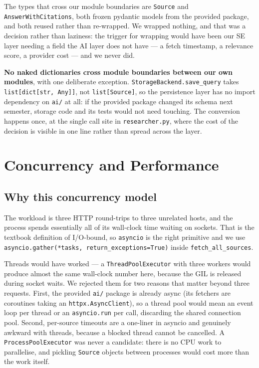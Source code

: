 \documentclass[11pt,a4paper]{article}
\begin{document}
The types that cross our module boundaries are \texttt{Source} and \texttt{AnswerWithCitations},
both frozen pydantic models from the provided package, and both reused rather than re-wrapped.
We wrapped nothing, and that was a decision rather than laziness: the trigger for wrapping would
have been our SE layer needing a field the AI layer does not have --- a fetch timestamp, a
relevance score, a provider cost --- and we never did.

\textbf{No naked dictionaries cross module boundaries between our own modules}, with one
deliberate exception. \texttt{StorageBackend.save\_query} takes \texttt{list[dict[str, Any]]},
not \texttt{list[Source]}, so the persistence layer has no import dependency on \texttt{ai/} at
all: if the provided package changed its schema next semester, storage code and its tests would
not need touching. The conversion happens once, at the single call site in
\texttt{researcher.py}, where the cost of the decision is visible in one line rather than spread
across the layer.

\section{Concurrency and Performance}\label{sec:concurrency}

\subsection{Why this concurrency model}

The workload is three HTTP round-trips to three unrelated hosts, and the process spends
essentially all of its wall-clock time waiting on sockets. That is the textbook definition of
I/O-bound, so \texttt{asyncio} is the right primitive and we use
\texttt{asyncio.gather(*tasks, return\_exceptions=True)} inside \texttt{fetch\_all\_sources}.

Threads would have worked --- a \texttt{ThreadPoolExecutor} with three workers would produce
almost the same wall-clock number here, because the GIL is released during socket waits. We
rejected them for two reasons that matter beyond three requests. First, the provided \texttt{ai/}
package is already async (its fetchers are coroutines taking an \texttt{httpx.AsyncClient}), so a
thread pool would mean an event loop per thread or an \texttt{asyncio.run} per call, discarding
the shared connection pool. Second, per-source timeouts are a one-liner in asyncio and genuinely
awkward with threads, because a blocked thread cannot be cancelled. A
\texttt{ProcessPoolExecutor} was never a candidate: there is no CPU work to parallelise, and
pickling \texttt{Source} objects between processes would cost more than the work itself.
\end{document}
